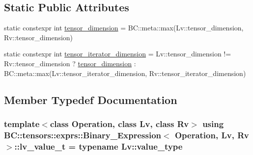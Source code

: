 \subsection*{Static Public Attributes}
\begin{DoxyCompactItemize}
\item 
static constexpr int \hyperlink{structBC_1_1tensors_1_1exprs_1_1Binary__Expression_a73afe6b099afa4ef242e6eb7be50ebef}{tensor\+\_\+dimension} = B\+C\+::meta\+::max(Lv\+::tensor\+\_\+dimension, Rv\+::tensor\+\_\+dimension)
\item 
static constexpr int \hyperlink{structBC_1_1tensors_1_1exprs_1_1Binary__Expression_a5fce7af061a989dafb9bed466c811f0d}{tensor\+\_\+iterator\+\_\+dimension} = Lv\+::tensor\+\_\+dimension != Rv\+::tensor\+\_\+dimension ? \hyperlink{structBC_1_1tensors_1_1exprs_1_1Binary__Expression_a73afe6b099afa4ef242e6eb7be50ebef}{tensor\+\_\+dimension} \+: B\+C\+::meta\+::max(Lv\+::tensor\+\_\+iterator\+\_\+dimension, Rv\+::tensor\+\_\+iterator\+\_\+dimension)
\end{DoxyCompactItemize}


\subsection{Member Typedef Documentation}
\subsubsection[{\texorpdfstring{lv\+\_\+value\+\_\+t}{lv_value_t}}]{\setlength{\rightskip}{0pt plus 5cm}template$<$class Operation, class Lv, class Rv$>$ using {\bf B\+C\+::tensors\+::exprs\+::\+Binary\+\_\+\+Expression}$<$ Operation, Lv, Rv $>$\+::{\bf lv\+\_\+value\+\_\+t} =  typename Lv\+::value\+\_\+type}\hypertarget{structBC_1_1tensors_1_1exprs_1_1Binary__Expression_a8ae3c31b3f8d8ffb55bc6b0fe80bb266}{}\label{structBC_1_1tensors_1_1exprs_1_1Binary__Expression_a8ae3c31b3f8d8ffb55bc6b0fe80bb266}
